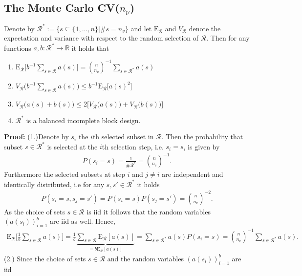 \documentclass[Research_Module_ES.tex]{subfiles}
\begin{document}
\subsection{The Monte Carlo CV($n_\nu$)}

\begin{lemma} Denote by $\mathcal{R}^\ast:= \{s\subseteq\{1,\dots,n\}|\# s=n_v\}$ and let $\mathrm{E}_\mathcal{R}$ and $V_\mathcal{R}$ denote the expectation and variance with respect to the random selection of $\mathcal{R}$. Then for any functions $a,b:\mathcal{R}^\ast\to \mathbb{R}$ it holds that
\begin{enumerate}
\item $\mathrm{E}_\mathcal{R} \bigl[ b^{-1}\sum_{s\in \mathcal{R}}a(s)\bigr] = \binom{n}{n_v}^{-1}\sum_{s\in\mathcal{R}^\ast}a(s)$
\item $V_\mathcal{R} \bigl( b^{-1}\sum_{s\in \mathcal{R}}a(s)\bigr) \le b^{-1} \mathrm{E}_\mathcal{R} \bigl[a(s)^2\bigr]$
\item $V_\mathcal{R}\bigl(a(s)+b(s)\bigr) \le 2\bigl[V_\mathcal{R}\bigl(a(s)\bigr)+V_\mathcal{R}\bigl(b(s)\bigr)\bigr]$
\item $\mathcal{R}^\ast$ is a balanced incomplete block design.
\end{enumerate}
\end{lemma}
\textbf{Proof:}
(1.)Denote by $s_i$ the $i$th selected subset in $\mathcal{R}$. Then the probability that subset $s \in \mathcal{R}^\ast$ is selected at the $i$th selection step, i.e. $s_i=s$, is given by
\begin{align*}
P(s_i=s)= \frac{1}{\# \mathcal{R}^\ast} = \binom{n}{n_v}^{-1}.
\end{align*}
Furthermore the selected subsets at step $i$ and $j\neq i$ are independent and identically distributed, i.e for any $s,s'\in \mathcal{R}^\ast$ it holds
\begin{align*}
P(s_i=s,s_j=s')=P(s_i=s)P(s_j=s')=\binom{n}{n_v}^{-2}.
\end{align*}
As the choice of sets $s\in \mathcal{R}$ is iid it follows that the random variables $(a(s_i))_{i=1}^b$ are iid as well. Hence, 
\begin{align*}
\mathrm{E}_\mathcal{R} \biggl[ \frac{1}{b}\sum_{s\in \mathcal{R}}a(s)\biggr] 
= \frac{1}{b}\underbrace{\sum_{s\in \mathcal{R}}\mathrm{E}_\mathcal{R} [a(s)]}_{=b\mathrm{E}_\mathcal{R}[a(s)]}
= \sum_{s\in \mathcal{R}^\ast}a(s)P(s_i = s)
=\binom{n}{n_v}^{-1}\sum_{s\in\mathcal{R}^\ast}a(s).
\end{align*}
(2.) Since the choice of sets $s\in \mathcal{R}$ and the random variables $(a(s_i))_{i=1}^b$ are iid
\end{document}
